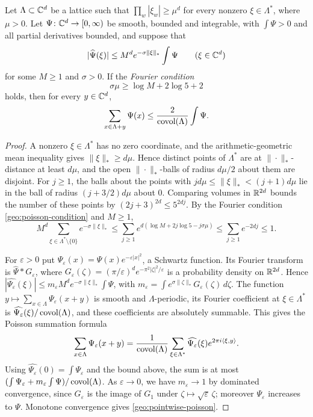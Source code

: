 \begin{lemma}\label{geo:poisson}
Let $\Lambda\subset\mathbb C^d$ be a lattice such that
$\prod_w|\xi_w|\ge\mu^d$ for every nonzero $\xi\in\Lambda^*$, where
$\mu>0$. Let $\Psi\colon\mathbb C^d\to[0,\infty)$ be smooth, bounded and
integrable, with $\int\Psi>0$ and all partial derivatives bounded, and
suppose that
\[
 |\widehat\Psi(\xi)|\le M^de^{-\sigma\|\xi\|_*}\int\Psi
 \qquad(\xi\in\mathbb C^d)
\]
for some $M\ge1$ and $\sigma>0$. If the \emph{Fourier condition}
\begin{equation}\label{geo:poisson-condition}
 \sigma\mu\ge\log M+2\log5+2
\end{equation}
holds, then for every $y\in\mathbb C^d$,
\begin{equation}\label{geo:pointwise-poisson}
 \sum_{x\in\Lambda+y}\Psi(x)\le\frac2{\operatorname{covol}(\Lambda)}\int\Psi.
\end{equation}
\end{lemma}

\begin{proof}
A nonzero $\xi\in\Lambda^*$ has no zero coordinate, and the
arithmetic-geometric mean inequality gives $\|\xi\|_*\ge d\mu$. Hence
distinct points of $\Lambda^*$ are at $\|\cdot\|_*$-distance at least
$d\mu$, and the open $\|\cdot\|_*$-balls of radius $d\mu/2$ about them
are disjoint. For $j\ge1$, the balls about the points with
$jd\mu\le\|\xi\|_*<(j+1)d\mu$ lie in the ball of radius $(j+3/2)d\mu$
about $0$. Comparing volumes in $\mathbb R^{2d}$ bounds the number of these
points by $(2j+3)^{2d}\le5^{2dj}$. By the Fourier condition
\eqref{geo:poisson-condition} and
$M\ge1$,
\[
 M^d\sum_{\xi\in\Lambda^*\setminus\{0\}}e^{-\sigma\|\xi\|_*}
 \le\sum_{j\ge1}e^{d(\log M+2j\log5-j\sigma\mu)}
 \le\sum_{j\ge1}e^{-2dj}\le1 .
\]

For $\varepsilon>0$ put $\Psi_\varepsilon(x)=\Psi(x)e^{-\varepsilon|x|^2}$, a Schwartz
function. Its Fourier transform is $\widehat\Psi*G_\varepsilon$, where
$G_\varepsilon(\zeta)=(\pi/\varepsilon)^de^{-\pi^2|\zeta|^2/\varepsilon}$ is a probability
density on $\mathbb R^{2d}$. Hence
$|\widehat{\Psi_\varepsilon}(\xi)|\le m_\varepsilon M^de^{-\sigma\|\xi\|_*}\int\Psi$,
with $m_\varepsilon=\int e^{\sigma\|\zeta\|_*}G_\varepsilon(\zeta)\,d\zeta$. The function
$y\mapsto\sum_{x\in\Lambda}\Psi_\varepsilon(x+y)$ is smooth and
$\Lambda$-periodic, its Fourier coefficient at $\xi\in\Lambda^*$ is
$\widehat{\Psi_\varepsilon}(\xi)/\operatorname{covol}(\Lambda)$, and these coefficients are
absolutely summable. This gives the Poisson summation formula
\[
 \sum_{x\in\Lambda}\Psi_\varepsilon(x+y)
 =\frac1{\operatorname{covol}(\Lambda)}\sum_{\xi\in\Lambda^*}\widehat{\Psi_\varepsilon}(\xi)
 e^{2\pi i\langle\xi,y\rangle}.
\]
Using $\widehat{\Psi_\varepsilon}(0)=\int\Psi_\varepsilon$ and the bound above, the sum
is at most $(\int\Psi_\varepsilon+m_\varepsilon\int\Psi)/\operatorname{covol}(\Lambda)$. As
$\varepsilon\to0$, we have $m_\varepsilon\to1$ by dominated convergence, since
$G_\varepsilon$ is the image of $G_1$ under $\zeta\mapsto\sqrt\varepsilon\,\zeta$;
moreover $\Psi_\varepsilon$ increases to $\Psi$. Monotone convergence gives
\eqref{geo:pointwise-poisson}.
\end{proof}


